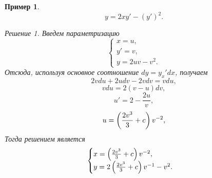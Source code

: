 \documentclass[a5paper, 11pt]{article}
\theoremstyle{definition}
\theoremstyle{plain}
\newtheorem{Ex}{Пример}
\theoremstyle{remark}
\newtheorem*{Solution}{Решение}
\begin{document}
	\begin{Ex}
		\[
		y=2xy'-(y')^2.
		\]
		\begin{Solution}
			Введем параметризацию 
			\[
			\begin{cases}
				x = u,\\
				y'=v,\\
				y=2uv-v^2.			
			\end{cases}
			\]
			Отсюда, используя основное соотношение $dy = y_x' dx$, получаем
			\[
				2vdu + 2udv - 2vdv = v du,
			\]
			\[
				vdu = 2(v-u)dv,
			\]
			\[
				u' = 2-\frac{2u}{v},
			\]
			\[
				u= \left(\frac{2v^3}{3} + c\right)v^{-2},
			\]
			Тогда решением является
			\[
				\begin{cases}
				x=\left(\frac{2v^3}{3} + c\right)v^{-2},\\
				y = 2\left(\frac{2v^3}{3} + c\right)v^{-1} - v^2.
				\end{cases}
			\]
		\end{Solution}
	\end{Ex}
\end{document}
